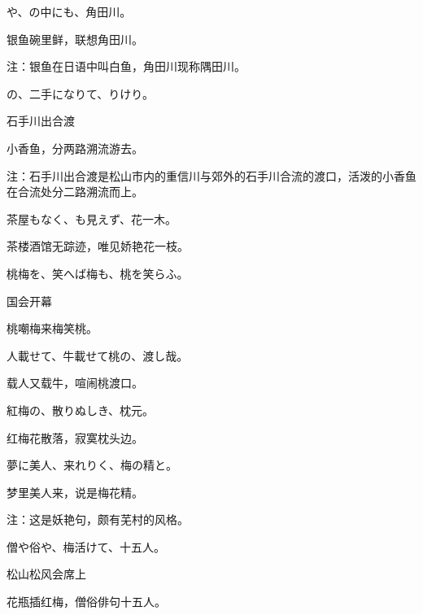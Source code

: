 \begin{haiku}
    {\FH {}や、の中にも、角田川。}

    {\FK 银鱼碗里鲜，联想角田川。}

    {\FT 注：银鱼在日语中叫白鱼，角田川现称隅田川。}
\end{haiku}

\begin{haiku}
    {\FH {}の、二手になりて、りけり。}

    {\FK 石手川出合渡}

    {\FK 小香鱼，分两路溯流游去。}

    {\FT 注：石手川出合渡是松山市内的重信川与郊外的石手川合流的渡口，活泼的小香鱼在合流处分二路溯流而上。}
\end{haiku}

\begin{haiku}
    {\FH 茶屋もなく、も見えず、花一木。}

    {\FK 茶楼酒馆无踪迹，唯见娇艳花一枝。}
\end{haiku}

\begin{haiku}
    {\FH 桃梅を、笑へば梅も、桃を笑らふ。}

    {\FK 国会开幕}

    {\FK 桃嘲梅来梅笑桃。}
\end{haiku}

\begin{haiku}
    {\FH 人載せて、牛載せて桃の、渡し哉。}

    {\FK 载人又载牛，喧闹桃渡口。}
\end{haiku}

\begin{haiku}
    {\FH 紅梅の、散りぬしき、枕元。}

    {\FK 红梅花散落，寂寞枕头边。}
\end{haiku}

\begin{haiku}
    {\FH 夢に美人、来れりく、梅の精と。}

    {\FK 梦里美人来，说是梅花精。}

    {\FT 注：这是妖艳句，颇有芜村的风格。}
\end{haiku}

\begin{haiku}
    {\FH 僧や俗や、梅活けて、十五人。}

    {\FK 松山松风会席上}

    {\FK 花瓶插红梅，僧俗俳句十五人。}
\end{haiku}

